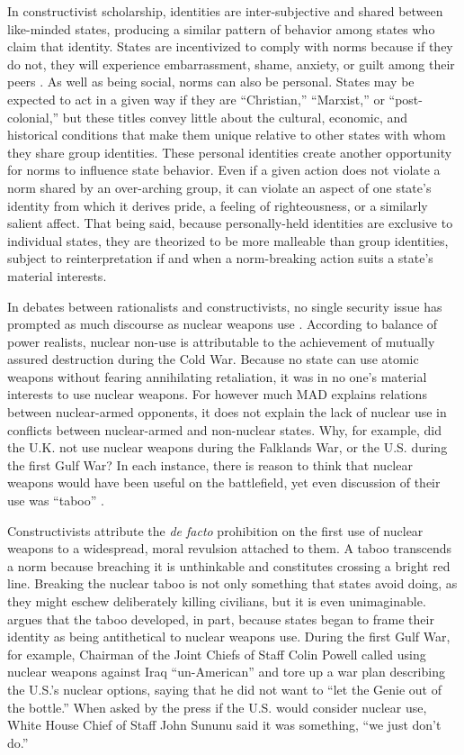 \documentclass[12pt]{article}
\begin{document}
In constructivist scholarship, identities are inter-subjective and shared between like-minded states, producing a similar pattern of behavior among states who claim that identity. States are incentivized to comply with norms because if they do not, they will experience embarrassment, shame, anxiety, or guilt among their peers \citep{fearon_what_1999}. As well as being social, norms can also be personal. States may be expected to act in a given way if they are “Christian,” “Marxist,” or “post-colonial,” but these titles convey little about the cultural, economic, and historical conditions that make them unique relative to other states with whom they share group identities. These personal identities create another opportunity for norms to influence state behavior. Even if a given action does not violate a norm shared by an over-arching group, it can violate an aspect of one state's identity from which it derives pride, a feeling of righteousness, or a similarly salient affect. That being said, because personally-held identities are exclusive to individual states, they are theorized to be more malleable than group identities, subject to reinterpretation if and when a norm-breaking action suits a state's material interests. 

In debates between rationalists and constructivists, no single security issue has prompted as much discourse as nuclear weapons use \citep{paul_nuclear_1995, sagan_realist_2004, tannenwald_nuclear_2007, paul_nuclear_1995, smetana_forum_2021}. According to balance of power realists, nuclear non-use is attributable to the achievement of mutually assured destruction during the Cold War. Because no state can use atomic weapons without fearing annihilating retaliation, it was in no one's material interests to use nuclear weapons. For however much MAD explains relations between nuclear-armed opponents, it does not explain the lack of nuclear use in conflicts between nuclear-armed and non-nuclear states. Why, for example, did the U.K. not use nuclear weapons during the Falklands War, or the U.S. during the first Gulf War? In each instance, there is reason to think that nuclear weapons would have been useful on the battlefield, yet even discussion of their use was “taboo” \citep{paul_nuclear_1995, tannenwald_nuclear_2007}. 

Constructivists attribute the \textit{de facto} prohibition on the first use of nuclear weapons to a widespread, moral revulsion attached to them. A taboo transcends a norm because breaching it is unthinkable and constitutes crossing a bright red line. Breaking the nuclear taboo is not only something that states avoid doing, as they might eschew deliberately killing civilians, but it is even unimaginable. \citet{tannenwald_nuclear_2007} argues that the taboo developed, in part, because states began to frame their identity as being antithetical to nuclear weapons use. During the first Gulf War, for example, Chairman of the Joint Chiefs of Staff Colin Powell called using nuclear weapons against Iraq “un-American” and tore up a war plan describing the U.S.'s nuclear options, saying that he did not want to “let the Genie out of the bottle.” When asked by the press if the U.S. would consider nuclear use, White House Chief of Staff John Sununu said it was something, “we just don't do.”
\end{document}
